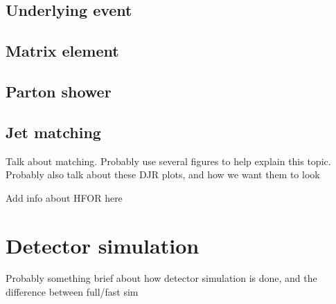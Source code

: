 \FloatBarrier
\subsection{Underlying event}

\FloatBarrier
\subsection{Matrix element}

\FloatBarrier
\subsection{Parton shower}

\FloatBarrier
\subsection{Jet matching}
\label{sec:jet_matching}

{\color{red} Talk about matching. Probably use several figures to help explain
  this topic. Probably also talk about these DJR plots, and how we want them
  to look}

{\color{red} Add info about HFOR here}

\FloatBarrier
\section{Detector simulation}
\label{sec:det_sim}

{\color{red} Probably something brief about how detector simulation is done, and
  the difference between full/fast sim}

